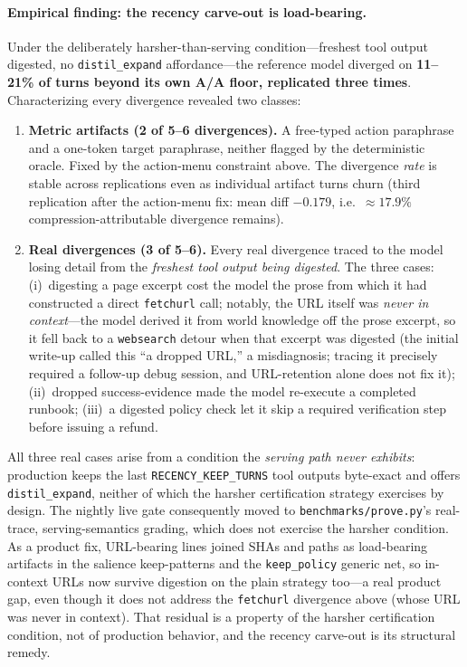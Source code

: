 \documentclass{article}
\begin{document}
\paragraph{Empirical finding: the recency carve-out is load-bearing.}
Under the deliberately harsher-than-serving condition---freshest tool output digested, no
\texttt{distil\_expand} affordance---the reference model diverged on \textbf{11--21\% of
turns beyond its own A/A floor, replicated three times}. Characterizing every divergence
revealed two classes:

\begin{enumerate}
  \item \textbf{Metric artifacts (2 of 5--6 divergences).} A free-typed action paraphrase and
    a one-token target paraphrase, neither flagged by the deterministic oracle. Fixed by the
    action-menu constraint above. The divergence \emph{rate} is stable across replications
    even as individual artifact turns churn (third replication after the action-menu fix:
    mean diff $-0.179$, i.e.\ $\approx17.9\%$ compression-attributable divergence
    remains).

  \item \textbf{Real divergences (3 of 5--6).} Every real divergence traced to the model
    losing detail from the \emph{freshest tool output being digested}. The three cases:
    (i)~digesting a page excerpt cost the model the prose from which it had constructed a
    direct \texttt{fetchurl} call; notably, the URL itself was \emph{never in context}---the
    model derived it from world knowledge off the prose excerpt, so it fell back to a
    \texttt{websearch} detour when that excerpt was digested (the initial write-up called
    this ``a dropped URL,'' a misdiagnosis; tracing it precisely required a follow-up debug
    session, and URL-retention alone does not fix it); (ii)~dropped success-evidence made the
    model re-execute a completed runbook; (iii)~a digested policy check let it skip a
    required verification step before issuing a refund.
\end{enumerate}

All three real cases arise from a condition the \emph{serving path never exhibits}: production
keeps the last \texttt{RECENCY\_KEEP\_TURNS} tool outputs byte-exact and offers
\texttt{distil\_expand}, neither of which the harsher certification strategy exercises by
design. The nightly live gate consequently moved to \texttt{benchmarks/prove.py}'s real-trace,
serving-semantics grading, which does not exercise the harsher condition. As a product fix,
URL-bearing lines joined SHAs and paths as load-bearing artifacts in the salience
keep-patterns and the \texttt{keep\_policy} generic net, so in-context URLs now survive
digestion on the plain strategy too---a real product gap, even though it does not address the
\texttt{fetchurl} divergence above (whose URL was never in context). That residual is a
property of the harsher certification condition, not of production behavior, and the recency
carve-out is its structural remedy.
\end{document}
